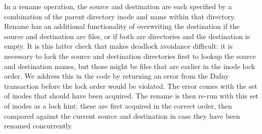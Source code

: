 In a rename operation, the source and destination are each specified by a
combination of the parent directory inode and name within that directory. Rename
has an additional functionality of overwriting the destination if the source and
destination are files, or if both are directories and the destination is empty.
It is this latter check that makes deadlock avoidance difficult: it is necessary
to lock the source and destination directories first to lookup the source and
destination names, but those might be files that are earlier in the inode lock
order. We address this in the code by returning an error from the Dafny
transaction before the lock order would be violated. The error comes with the
set of inodes that should have been acquired.  The rename is then re-run with
this set of inodes as a lock hint; these are first acquired in the correct
order, then compared against the current source and destination in case they
have been renamed concurrently.




